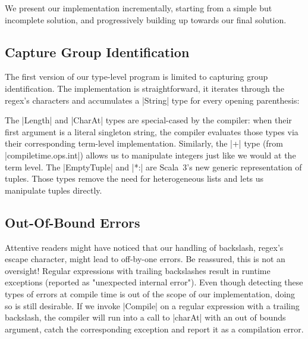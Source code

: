 We present our implementation incrementally, starting from a simple but incomplete solution, and progressively building up towards our final solution.

\subsection{Capture Group Identification}

The first version of our type-level program is limited to capturing group identification.
The implementation is straightforward, it iterates through the regex's characters and accumulates a |String| type for every opening parenthesis:

\regexFirstIteration
%
%

\noindent
The |Length| and |CharAt| types are special-cased by the compiler: when their first argument is a literal singleton string, the compiler evaluates those types via their corresponding term-level implementation.
Similarly, the |+| type (from |compiletime.ops.int|) allows us to manipulate integers just like we would at the term level.
The |EmptyTuple| and |*:| are Scala~3's new generic representation of tuples.
Those types remove the need for heterogeneous lists and lets us manipulate tuples directly.

\subsection{Out-Of-Bound Errors}

Attentive readers might have noticed that our handling of backslash, regex's escape character, might lead to off-by-one errors.
Be reassured, this is not an oversight!
Regular expressions with trailing backslashes result in runtime exceptions (reported as "unexpected internal error").
Even though detecting these types of errors at compile time is out of the scope of our implementation, doing so is still desirable.
If we invoke |Compile| on a regular expression with a trailing backslash, the compiler will run into a call to |charAt| with an out of bounds argument, catch the corresponding exception and report it as a compilation error.

